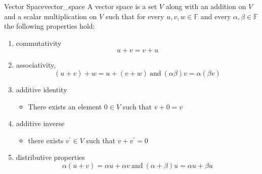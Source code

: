 \begin{definition}
{Vector Space}{vector_space}
A vector space is a set \(V\) along with an addition on \(V\) and a scalar
multiplication on \(V\) such that for every  \( u, v, w \in  \mathbb{F} \) and
every \( \alpha , \beta \in  \mathbb{F} \) the following properties hold:
\begin{enumerate}
    \item commutativity
    \[
    u+v = v+u 
    \]
    \item associativity, 
    \[
    (u+v)+w = u+(v+w) ~\text{and}~   (\alpha  \beta ) v = \alpha (\beta  v) 
    \]
    \item additive identity
    \begin{itemize}
        \item There exists an element \(0 \in V\) such that \(v+0 = v\) 
    \end{itemize}
    \item additive inverse
    \begin{itemize}
        \item there exists \(v ^{ \prime  }  \in V\) such that \(v+v ^{ ' }  =
            0\)
    \end{itemize}
    \item distributive properties
    \[
    \alpha (u+v) = \alpha  u+ \alpha  v ~\text{and}~   (\alpha +\beta ) u =
    \alpha  u+\beta  u
    \]
\end{enumerate}
\end{definition}

